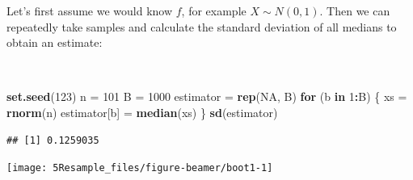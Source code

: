 \documentclass[
  10pt,
  ignorenonframetext,
]{beamer}
\newenvironment{Shaded}{\begin{snugshade}}{\end{snugshade}}
\newcommand{\ConstantTok}[1]{\textcolor[rgb]{0.56,0.35,0.01}{#1}}
\newcommand{\ControlFlowTok}[1]{\textcolor[rgb]{0.13,0.29,0.53}{\textbf{#1}}}
\newcommand{\DecValTok}[1]{\textcolor[rgb]{0.00,0.00,0.81}{#1}}
\newcommand{\FunctionTok}[1]{\textcolor[rgb]{0.13,0.29,0.53}{\textbf{#1}}}
\newcommand{\NormalTok}[1]{#1}
\newcommand{\OtherTok}[1]{\textcolor[rgb]{0.56,0.35,0.01}{#1}}
\newcommand{\SpecialCharTok}[1]{\textcolor[rgb]{0.81,0.36,0.00}{\textbf{#1}}}
\begin{document}
\begin{frame}[fragile]
Let's first assume we would know \(f\), for example \(X\sim N(0,1)\).
Then we can repeatedly take samples and calculate the standard deviation
of all medians to obtain an estimate:

\(~\)

\scriptsize

\begin{Shaded}
\begin{Highlighting}[]
\FunctionTok{set.seed}\NormalTok{(}\DecValTok{123}\NormalTok{)}
\NormalTok{n }\OtherTok{=} \DecValTok{101}
\NormalTok{B }\OtherTok{=} \DecValTok{1000}
\NormalTok{estimator }\OtherTok{=} \FunctionTok{rep}\NormalTok{(}\ConstantTok{NA}\NormalTok{, B)}
\ControlFlowTok{for}\NormalTok{ (b }\ControlFlowTok{in} \DecValTok{1}\SpecialCharTok{:}\NormalTok{B) \{}
\NormalTok{    xs }\OtherTok{=} \FunctionTok{rnorm}\NormalTok{(n)}
\NormalTok{    estimator[b] }\OtherTok{=} \FunctionTok{median}\NormalTok{(xs)}
\NormalTok{\}}
\FunctionTok{sd}\NormalTok{(estimator)}
\end{Highlighting}
\end{Shaded}

\begin{verbatim}
## [1] 0.1259035
\end{verbatim}
\end{frame}

\begin{frame}
\begin{center}\texttt{[image: 5Resample\_files/figure-beamer/boot1-1]} \end{center}
\end{frame}
\end{document}
